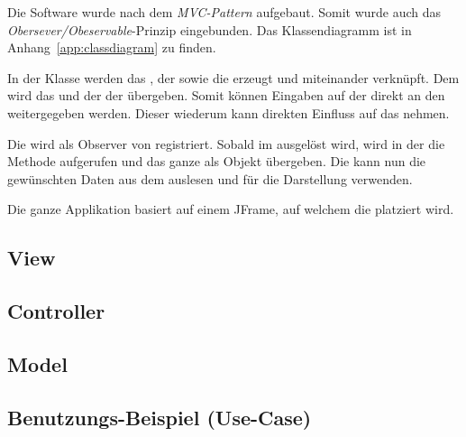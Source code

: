 Die Software wurde nach dem \emph{MVC-Pattern} aufgebaut. Somit wurde auch das
\emph{Obersever/Obeservable}-Prinzip  eingebunden. Das Klassendiagramm  ist in
Anhang~\ref{app:classdiagram} zu finden.

In   der    Klasse       werden   das    ,   der
   sowie   die      erzeugt   und   miteinander
verkn\"upft. Dem      wird   das     und   der
  der    \"ubergeben. Somit  k\"onnen  Eingaben
auf  der     direkt   an  den     weitergegeben
werden. Dieser wiederum kann direkten Einfluss auf das  nehmen.

Die    wird  als   Observer  von    registriert. Sobald
im      ausgel\"ost   wird,  wird  in  der
 die Methode   aufgerufen und das ganze 
als Objekt \"ubergeben. Die   kann nun die  gew\"unschten Daten aus
dem  auslesen und f\"ur die Darstellung verwenden.

Die ganze  Applikation basiert auf  einem JFrame, auf welchem  die 
platziert wird.

\subsection{View}
\label{subs:view}



\subsection{Controller}



\subsection{Model}



\subsection{Benutzungs-Beispiel (Use-Case)}

